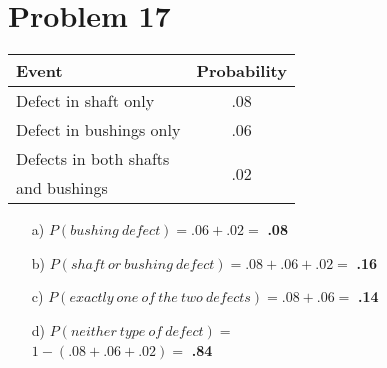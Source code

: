 \documentclass{article}
\begin{document}
\section*{Problem 17}
\begin{multicols}{2}
    \begin{tabular}{l c}
    Event                   & Probability \\
    \hline
    Defect in shaft only    & .08 \\
    Defect in bushings only & .06 \\
    Defects in both shafts & \multirow{2}{*}{.02} \\
    and bushings & {} \\    
    \end{tabular}
    
    \vfill
    \columnbreak
    
    \begin{enumerate}
        \item[a)] $P(bushing\ defect) = .06 + .02 =$ \textbf{.08}
        \item[b)] $P(shaft\ or\ bushing\ defect) = .08 + .06 + .02 =$ \textbf{.16}
        \item[c)] $P(exactly\ one\ of\ the\ two\ defects) = .08 + .06 =$ \textbf{.14}
        \item[d)] $P(neither\ type\ of\ defect) =$\\$ 1 - (.08 + .06 + .02) =$ \textbf{.84}
    \end{enumerate}
    
\end{multicols}
\end{document}
